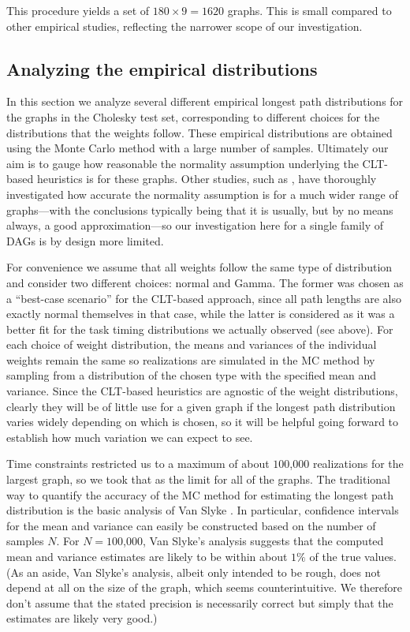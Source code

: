 \documentclass[12pt]{article}
\begin{document}
  This procedure yields a set of $180 \times 9 = 1620$ graphs. This is small compared to other empirical studies, reflecting the narrower scope of our investigation.

\subsection{Analyzing the empirical distributions}
\label{subsect.empirical_distribution}

In this section we analyze several different empirical longest path distributions for the graphs in the Cholesky test set, corresponding to different choices for the distributions that the weights follow. These empirical distributions are obtained using the Monte Carlo method with a large number of samples. Ultimately our aim is to gauge how reasonable the normality assumption underlying the CLT-based heuristics is for these graphs. Other studies, such as \cite{can16}, have thoroughly investigated how accurate the normality assumption is for a much wider range of graphs---with the conclusions typically being that it is usually, but by no means always, a good approximation---so our investigation here for a single family of DAGs is by design more limited. 

For convenience we assume that all weights follow the same type of distribution and consider two different choices: normal and Gamma. The former was chosen as a ``best-case scenario'' for the CLT-based approach, since all path lengths are also exactly normal themselves in that case, while the latter is considered as it was a better fit for the task timing distributions we actually observed (see above). For each choice of weight distribution, the means and variances of the individual weights remain the same so realizations are simulated in the MC method by sampling from a distribution of the chosen type with the specified mean and variance. Since the CLT-based heuristics are agnostic of the weight distributions, clearly they will be of little use for a given graph if the longest path distribution varies widely depending on which is chosen, so it will be helpful going forward to establish how much variation we can expect to see.

Time constraints restricted us to a maximum of about $100$,$000$ realizations for the largest graph, so we took that as the limit for all of the graphs. The traditional way to quantify the accuracy of the MC method for estimating the longest path distribution is the basic analysis of Van Slyke \cite{van63}. In particular, confidence intervals for the mean and variance can easily be constructed based on the number of samples $N$. For $N = 100$,$000$, Van Slyke's analysis suggests that the computed mean and variance estimates are likely to be within about $1\%$ of the true values. (As an aside, Van Slyke's analysis, albeit only intended to be rough, does not depend at all on the size of the graph, which seems counterintuitive. We therefore don't assume that the stated precision is necessarily correct but simply that the estimates are likely very good.)
\end{document}
